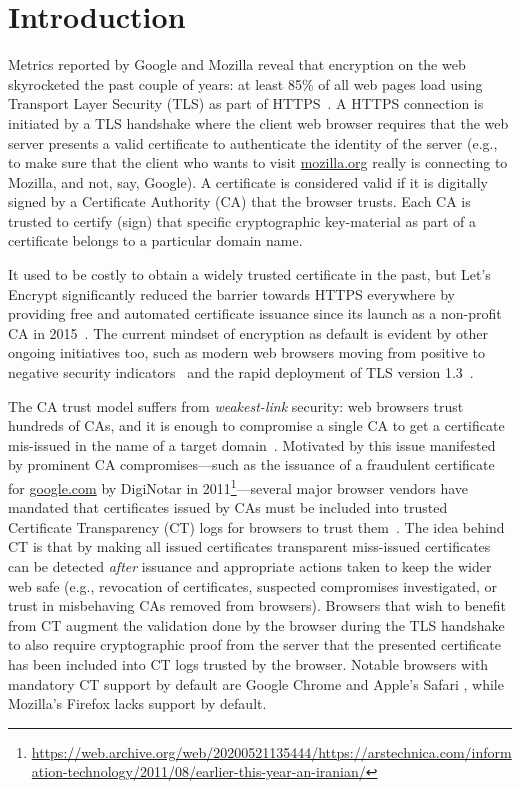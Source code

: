 \section{Introduction} \label{sec:introduction}
Metrics reported by Google and Mozilla reveal that encryption on the web
skyrocketed the past couple of years: at least 85\% of all web pages load using
Transport Layer Security (TLS) as part of
HTTPS~\cite{google-metrics,mozilla-metrics}. A HTTPS connection is initiated by
a TLS handshake where the client web browser requires that the web server
presents a valid certificate to authenticate the identity of the server (e.g.,
to make sure that the client who wants to visit \url{mozilla.org} really is
connecting to Mozilla, and not, say, Google). A certificate is considered valid
if it is digitally signed by a Certificate Authority (CA) that the browser
trusts. Each CA is trusted to certify (sign) that specific cryptographic
key-material as part of a certificate belongs to a particular domain name.

It used to be costly to obtain a widely trusted certificate in the past, but
Let's Encrypt significantly reduced the barrier towards HTTPS everywhere by
providing free and automated certificate issuance since its launch as a
non-profit CA in 2015~\cite{le}. The current mindset of encryption as default is
evident by other ongoing initiatives too, such as modern web browsers moving
from positive to negative security indicators~\cite{chrome-ui,firefox-ui} and
the rapid deployment of TLS version 1.3~\cite{rapid-tls13}.

The CA trust model suffers from \emph{weakest-link} security: web browsers trust
hundreds of CAs, and it is enough to compromise a single CA to get a certificate
mis-issued in the name of a target domain~\cite{ca-ecosystem,https-sok}.
Motivated by this issue manifested by prominent CA compromises---such as the
issuance of a fraudulent certificate for \url{google.com} by DigiNotar in
2011\footnote{\url{https://web.archive.org/web/20200521135444/https://arstechnica.com/information-technology/2011/08/earlier-this-year-an-iranian/}}---several
major browser vendors have mandated that certificates issued by CAs must be
included into trusted Certificate Transparency (CT) logs for browsers to trust
them~\cite{ct/a,ct,ct/bis}. The idea behind CT is that by making all issued
certificates transparent miss-issued certificates can be detected \emph{after}
issuance and appropriate actions taken to keep the wider web safe (e.g.,
revocation of certificates, suspected compromises investigated, or trust in
misbehaving CAs removed from browsers). Browsers that wish to benefit from CT
augment the validation done by the browser during the TLS handshake to also
require cryptographic proof from the server that the presented certificate has
been included into CT logs trusted by the browser. Notable browsers with
mandatory CT support by default are Google Chrome and Apple's Safari
\cite{chrome-policy,safari-policy}, while Mozilla's Firefox lacks support by
default.

